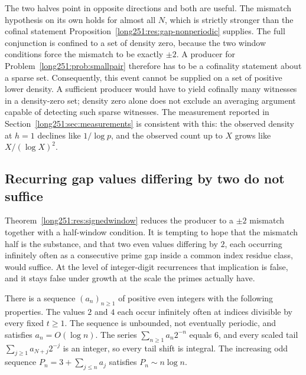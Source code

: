 The two halves point in opposite directions and both are useful.  The mismatch
hypothesis on its own holds for almost all $N$, which is strictly stronger than
the cofinal statement Proposition~\ref{long251:res:gap-nonperiodic} supplies.  The full
conjunction is confined to a set of density zero, because the two window
conditions force the mismatch to be exactly $\pm2$.  A producer for
Problem~\ref{long251:prob:smallpair} therefore has to be a cofinality statement about
a sparse set.  Consequently, this event cannot be supplied on a set of positive
lower density.  A sufficient producer would have to yield cofinally many
witnesses in a density-zero set; density zero alone does not exclude an
averaging argument capable of detecting such sparse witnesses.  The measurement reported
in Section~\ref{long251:sec:measurements} is consistent with this: the observed density
at $h=1$ declines like $1/\log p$, and the observed count up to $X$ grows like
$X/(\log X)^2$.

\subsection{Recurring gap values differing by two do not suffice}

Theorem~\ref{long251:res:signedwindow} reduces the producer to a $\pm2$ mismatch
together with a half-window condition.  It is tempting to hope that the
mismatch half is the substance, and that two even values differing by $2$, each
occurring infinitely often as a consecutive prime gap inside a common index
residue class, would suffice.  At the level of integer-digit recurrences that
implication is false, and it stays false under growth at the scale the primes
actually have.

\begin{theorem}\label{long251:res:polignacfail}
There is a sequence $(a_n)_{n\ge1}$ of positive even integers with the
following properties.  The values $2$ and $4$ each occur infinitely often at
indices divisible by every fixed $t\ge1$.  The sequence is unbounded, not
eventually periodic, and satisfies $a_n=O(\log n)$.  The series
$\sum_{n\ge1}a_n2^{-n}$ equals $6$, and every scaled tail
$\sum_{j\ge1}a_{N+j}2^{-j}$ is an integer, so every tail shift is integral.
The increasing odd sequence $P_n=3+\sum_{j\le n}a_j$ satisfies
$P_n\sim n\log n$.
\end{theorem}

